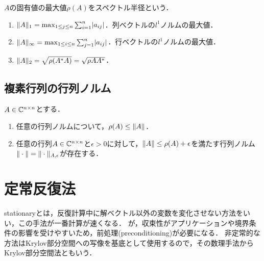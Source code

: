 \documentclass[uplatex, dvipdfmx]{jsreport}
\begin{document}
\begin{definition}
    $A$の固有値の最大値$\rho(A)$をスペクトル半径という．
\end{definition}

\begin{proposition}[p-行列ノルムの特徴付け]\mbox{}
    \begin{enumerate}
        \item $\|A\|_1=\max_{1\le j\le n}\sum_{i=1}^n\lvert a_{ij}\rvert$．列ベクトルの$l^1$ノルムの最大値．
        \item $\|A\|_\infty=\max_{1\le i\le n}\sum_{j=1}^n\lvert a_{ij}\rvert$．行ベクトルの$l^1$ノルムの最大値．
        \item $\|A\|_2=\sqrt{\rho(A^*A)}=\sqrt{\rho{AA^*}}$．
    \end{enumerate}
\end{proposition}

\subsection{複素行列の行列ノルム}

\begin{proposition}
    $A\in\mathbb{C}^{n\times n}$とする．
    \begin{enumerate}
        \item 任意の行列ノルムについて，$\rho(A)\le\|A\|$．
        \item 任意の行列$A\in\mathbb{C}^{n\times n}$と$\epsilon>0$に対して，$\|A\|\le\rho(A)+\epsilon$を満たす行列ノルム$\|\cdot\|=\|\cdot\|_{A,\epsilon}$が存在する．
    \end{enumerate}
\end{proposition}


\section{定常反復法}

\begin{tcolorbox}[colframe=ForestGreen, colback=ForestGreen!10!white,breakable,colbacktitle=ForestGreen!40!white,coltitle=black,fonttitle=\bfseries\sffamily,
title=Stationary Iterative Method]
    stationaryとは，反復計算中に解ベクトル以外の変数を変化させない方法をいい，この手法が一番計算が速くなる．
    が，収束性がアプリケーションや境界条件の影響を受けやすいため，前処理(preconditioning)が必要になる．
    非定常的な方法はKrylov部分空間への写像を基底として使用するので，その数理手法からKrylov部分空間法ともいう．
\end{tcolorbox}
\end{document}
